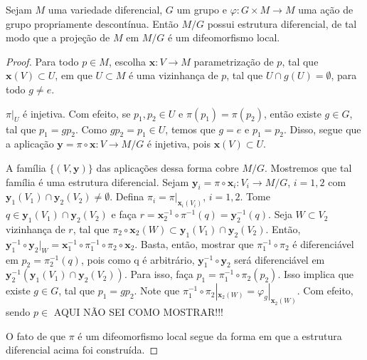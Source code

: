 \begin{proposition}
    \label{loc:prop_7_:_estrutura_diferencial_da_variedade_quociente.}
    Sejam $M$ uma variedade diferencial, $G$ um grupo e $\varphi:G\times M\to M$ uma ação de grupo propriamente descontínua. Então $M/G$ possui estrutura diferencial, de tal modo que a projeção de $M$ em $M/G$ é um difeomorfismo local.
    \begin{proof}

        Para todo $p \in M$, escolha $\mathbf{x}:V\to M$ parametrização de $p$, tal que $\mathbf{x}(V)\subset U$, em que $U\subset M$ é uma vizinhança de $p$, tal que $U\cap g(U)=\emptyset$, para todo $g \neq e$.

        $\pi|_{U}$ é injetiva. Com efeito, se $p_{1}, p_{2} \in U$ e $\pi(p_{1})=\pi(p_{2})$, então existe $g \in G$, tal que $p_{1}=gp_{2}$. Como $gp_{2}=p_{1} \in U$, temos que $g=e$ e $p_{1}=p_{2}$.
        Disso, segue que a aplicação $\mathbf{y}=\pi \circ \mathbf{x}:V\to M/G$ é injetiva, pois $\mathbf{x}(V)\subset U$.

        A família $\{ (V, \mathbf{y}) \}$ das aplicações dessa forma cobre $M/G$. Mostremos que tal família é uma estrutura diferencial. Sejam $\mathbf{y}_{i}=\pi \circ \mathbf{x}_{i}:V_{i}\to M/G$, $i=1, 2$ com $\mathbf{y}_{1}(V_{1})\cap \mathbf{y}_{2}(V_{2})\neq \emptyset$.
        Defina $\pi_{i}=\pi|_{\mathbf{x}_{i}(V_{i})}$, $i=1, 2$.
        Tome $q \in \mathbf{y}_{1}(V_{1})\cap \mathbf{y}_{2}(V_{2})$ e faça $r =\mathbf{x}_{2}^{-1} \circ \pi ^{-1}(q)=\mathbf{y}_{2}^{-1}(q)$.
        Seja $W \subset V_{2}$ vizinhança de $r$, tal que $\pi_{2} \circ \mathbf{x}_{2}(W)\subset \mathbf{y}_{1}(V_{1})\cap \mathbf{y}_{2}(V_{2})$. Então, $\mathbf{y}_{1}^{-1} \circ \mathbf{y}_{2}|_{W}=\mathbf{x}_{1}^{-1} \circ \pi_{1} ^{-1} \circ\pi_{2} \circ \mathbf{x}_{2}$. Basta, então, mostrar que $\pi_{1}^{-1} \circ \pi_{2}$ é diferenciável em $p_{2} = \pi_{2}^{-1}(q)$, pois como q é arbitrário, $\mathbf{y}_{1}^{-1} \circ \mathbf{y}_{2}$ será diferenciável em $\mathbf{y}_{2}^{-1}(\mathbf{y}_{1}(V_{1})\cap \mathbf{y}_{2}(V_{2}))$.
        Para isso, faça $p_{1}=\pi_{1}^{-1} \circ\pi_{2}(p_{2})$. Isso implica que existe $g \in G$, tal que $p_{1}=gp_{2}$. Note que $\pi_{1}^{-1}\circ\pi_{2}|_{\mathbf{x}_{2}(W)}=\varphi_{g}|_{\mathbf{x}_{2}(W)}$. Com efeito, sendo $p \in$ AQUI NÃO SEI COMO MOSTRAR!!!

        O fato de que $\pi$ é um difeomorfismo local segue da forma em que a estrutura diferencial acima foi construída.
    \end{proof}
\end{proposition}
